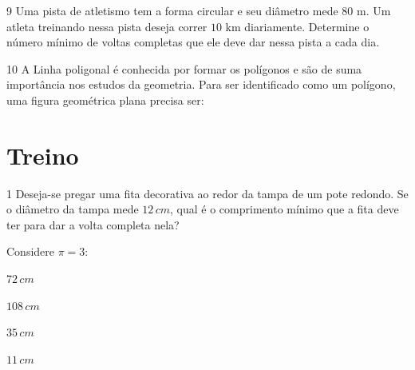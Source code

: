 

\num{9}  Uma pista de atletismo tem a forma circular e seu diâmetro mede $80$ m.
Um atleta treinando nessa pista deseja correr $10$ km diariamente.
Determine o número mínimo de voltas completas que ele deve dar nessa
pista a cada dia.


\num{10} A Linha poligonal é conhecida por formar os polígonos e são de suma
importância nos estudos da geometria. Para ser identificado como um
polígono, uma figura geométrica plana precisa ser:


\section{Treino}

\num{1}  Deseja-se pregar uma fita decorativa ao redor da tampa de um pote
redondo. Se o diâmetro da tampa mede $12\,cm$, qual é o comprimento mínimo
que a fita deve ter para dar a volta completa nela?

Considere $π = 3$:

\begin{escolha}
\item $72\,cm$
\item $108\,cm$
\item $35\,cm$
\item $11\,cm$
\end{escolha}



